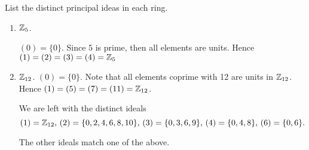 \documentclass[../hw7]{subfiles}
\begin{document}
\begin{problem}
List the distinct principal ideas in each ring.
\begin{enumerate}[label=\roman*)]
	\item $\mathbb{Z}_5$.

	      $(0)=\{0\}$.
	      Since $5$ is prime, then all elements are units.
	      Hence $(1)=(2)=(3)=(4)=\mathbb{Z}_5$

	\item $\mathbb{Z}_{12}$.
	      $(0)=\{0\}$.
	      Note that all elements coprime with 12 are units in $\mathbb{Z}_{12}$.
	      Hence $(1)=(5)=(7)=(11)=\mathbb{Z}_{12}$.

	      We are left with the distinct ideals \[
		      (1)=\mathbb{Z}_{12},\,
		      (2)=\{0,2,4,6,8,10\},\,
		      (3)=\{0,3,6,9\},\,
		      (4)=\{0,4,8\},\,
		      (6)=\{0,6\}
		      .\]

	      The other ideals match one of the above.
\end{enumerate}
\end{problem}
\end{document}
